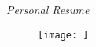 
%




\newpage

\pagestyle{fancy}
\lhead{}

\begin{center}
{\huge{\textit{Personal Resume}} \par}
\bigskip
\end{center}

\begin{figure}[h]
\centering
\texttt{[image: ]}

\end{figure}

